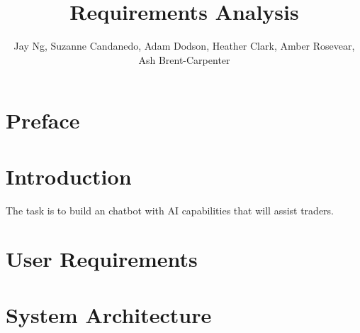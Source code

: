 \documentclass[]{IEEEtran}
\title{Requirements Analysis}
\author{Jay Ng, Suzanne Candanedo, Adam Dodson, Heather Clark, Amber Rosevear, Ash Brent-Carpenter}
\begin{document}
	\maketitle
	
	\begin{comment}
		Each team is required to provide a Requirements Analysis Report. This will document your teams understanding of the specification, and will raise any questions that you may have. As well as addressing the specification itself, the report should also document any decisions that have been made in terms of group management (i.e. how you have organized yourselves to meet the goals of this project, how often you will meet, how you will address decision making etc.) and what methods you intend using in the planning and design of your solution.
		
		The requirements analysis report is not a design document, but rather a means by which you can demonstrate your understanding of the project’s aims. Any queries that you have regarding the specification should be clearly stated in this report.
		
		This part of your first deliverable must not exceed four sides of A4. Any appendices or other attachments will be removed.
	\end{comment}

	\section{Preface}
	
	\section{Introduction}
	The task is to build an chatbot with AI capabilities that will assist traders. 
	
	
	\section{User Requirements}

	\section{System Architecture}
	
\end{document}
